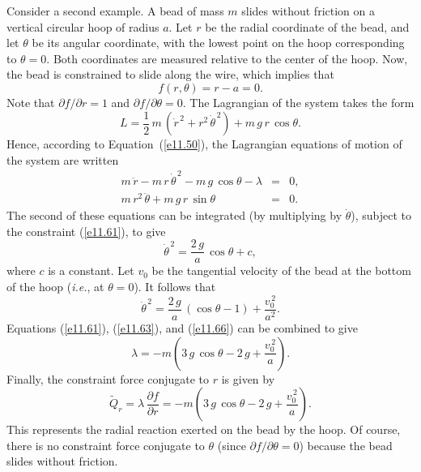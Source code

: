 Consider a second example. A bead of mass $m$ slides without friction
on a vertical circular hoop of radius $a$. Let $r$ be the
radial coordinate of the bead, and let $\theta$ be its
angular coordinate, with the lowest point on the hoop corresponding
to $\theta = 0$. Both coordinates are measured relative to the
center of the hoop. Now, the bead is constrained to slide along the wire, which implies that
\begin{equation}\label{e11.61}
f(r,\theta) = r - a = 0.
\end{equation}
Note that $\partial f/\partial r =1$ and $\partial f/\partial\theta = 0$.
The Lagrangian of the system takes the form
\begin{equation}
L = \frac{1}{2}\,m\,(\dot{r}^{\,2} + r^2\,\dot{\theta}^{\,2})
+ m\,g\,r\,\cos\theta.
\end{equation}
Hence, according to Equation~(\ref{e11.50}), the Lagrangian equations of motion
of the system are written
\begin{eqnarray}\label{e11.63}
m\,\ddot{r} -m\,r\,\dot{\theta}^{\,2} - m\,g\,\cos\theta - \lambda &=& 0,\\[0.5ex]
m\,r^2\,\ddot{\theta} + m\,g\,r\,\sin\theta &=& 0.
\end{eqnarray}
The second of these equations can be integrated  (by multiplying by $\dot{\theta}$), subject to the constraint  (\ref{e11.61}), to give
\begin{equation}
\dot{\theta}^{\,2} = \frac{2\,g}{a}\,\cos\theta + c,
\end{equation}
where $c$ is a constant. Let $v_0$ be the tangential velocity of the
bead at the bottom of the hoop ({\em i.e.}, at $\theta = 0$). It follows that
\begin{equation}\label{e11.66}
\dot{\theta}^{\,2} = \frac{2\,g}{a}\,(\cos\theta-1) + \frac{v_0^{\,2}}{a^2}.
\end{equation}
Equations (\ref{e11.61}), (\ref{e11.63}), and (\ref{e11.66}) can be combined to give
\begin{equation}
\lambda = - m \left(3\,g\,\cos\theta - 2\,g + \frac{v_0^{\,2}}{a}\right).
\end{equation}
Finally, the constraint force conjugate to $r$ is given by
\begin{equation}
\tilde{Q}_r = \lambda\,\frac{\partial f}{\partial r} = -m \left(3\,g\,\cos\theta - 2\,g + \frac{v_0^{\,2}}{a}\right).
\end{equation}
This represents the radial reaction exerted on the bead by the hoop. Of course, 
there is no constraint force conjugate to $\theta$ (since $\partial f/\partial\theta =0$) because the bead slides without friction.

